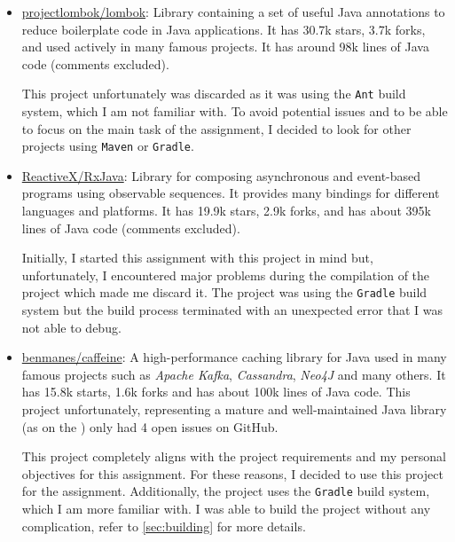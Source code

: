 \begin{itemize}
	\item \href{https://github.com/projectlombok/lombok}{projectlombok/lombok}: Library containing a set of useful Java annotations to reduce boilerplate code in Java applications. It has 30.7k stars, 3.7k forks, and used actively in many famous projects. It has around 98k lines of Java code (comments excluded).

	      This project unfortunately was discarded as it was using the \texttt{Ant} build system, which I am not familiar with. To avoid potential issues and to be able to focus on the main task of the assignment, I decided to look for other projects using \texttt{Maven} or \texttt{Gradle}.

	\item \href{https://github.com/ReactiveX/RxJava}{ReactiveX/RxJava}: Library for composing asynchronous and event-based programs using observable sequences. It provides many bindings for different languages and platforms. It has 19.9k stars, 2.9k forks, and has about 395k lines of Java code (comments excluded).

	      Initially, I started this assignment with this project in mind but, unfortunately, I encountered major problems during the compilation of the project which made me discard it. The project was using the \texttt{Gradle} build system but the build process terminated with an unexpected error that I was not able to debug.

      \item \href{https://github.com/ben-manes/caffeine}{benmanes/caffeine}: A high-performance caching library for Java used in many famous projects such as \textit{Apache Kafka}, \textit{Cassandra}, \textit{Neo4J} and many others. It has 15.8k starts, 1.6k forks and has about 100k lines of Java code. This project unfortunately, representing a mature and well-maintained Java library (as on the ) only had 4 open issues on GitHub.

    This project completely aligns with the project requirements and my personal objectives for this assignment. For these reasons, I decided to use this project for the assignment. Additionally, the project uses the \texttt{Gradle} build system, which I am more familiar with. I was able to build the project without any complication, refer to \autoref{sec:building} for more details.

\end{itemize}

